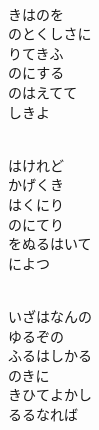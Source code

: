 \documentclass[10pt,b5j]{tarticle} %
\begin{document}
\begin{enumerate}
\begin{minipage}[c]{\blocksize}
    \end{minipage}
    \begin{minipage}[c]{\blocksize}
        
        \vspace{\linespace}
        \item~\\
        きはのを\\
        のとくしさに\\
        りてきふ\\
        のにする\\
        のはえてて\\
        しきよ
        
    \end{minipage}
    \begin{minipage}[c]{\blocksize}
        
        \vspace{\linespace}
        \item~\\
        はけれど\\
        かげくき\\
        はくにり\\
        のにてり\\
        をぬるはいて\\
        によつ
        
    \end{minipage}
    \begin{minipage}[c]{\blocksize}
        
        \vspace{\linespace}
        \item~\\
        いざはなんの\\
        ゆるぞの\\
        ふるはしかる\\
        のきに\\
        きひてよかし\\
        るるなれば
    
    \end{minipage}
\end{enumerate} %
\end{document}
